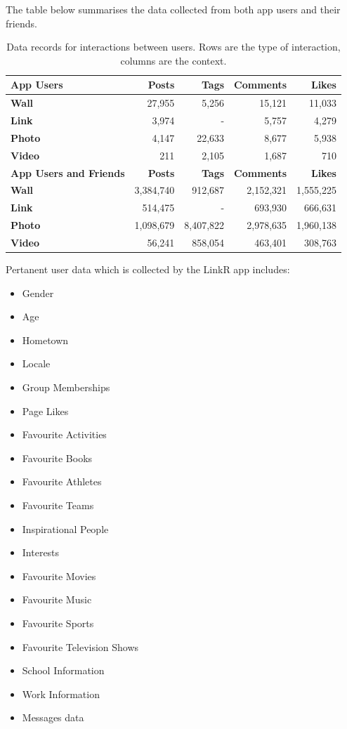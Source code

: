 The table below summarises the data collected from both app users and their friends.

\begin{table}[!htbp]
\centering
	\begin{tabular}{|l|r|r|r|r|} %
		\hline
		\textbf{App Users} & \textbf{Posts} & \textbf{Tags} & \textbf{Comments} & \textbf{Likes}  \\ \hline
		\textbf{Wall} & 27,955 & 5,256 & 15,121 & 11,033 \\ \hline
		\textbf{Link} & 3,974 & - & 5,757 & 4,279 \\ \hline
		\textbf{Photo} & 4,147 & 22,633 & 8,677 & 5,938 \\ \hline
		\textbf{Video} & 211 & 2,105 & 1,687 & 710 \\ \hline
		 \hline
		\textbf{App Users and Friends} & \textbf{Posts} & \textbf{Tags} & \textbf{Comments} & \textbf{Likes}  \\ \hline
		\textbf{Wall} & 3,384,740 & 912,687 & 2,152,321 & 1,555,225 \\ \hline
		\textbf{Link} & 514,475 & - & 693,930 & 666,631 \\ \hline
		\textbf{Photo} & 1,098,679 & 8,407,822 & 2,978,635 & 1,960,138 \\ \hline
		\textbf{Video} & 56,241 & 858,054 & 463,401 & 308,763 \\ \hline
	\end{tabular}
	\caption{Data records for interactions between users. Rows are the type of interaction, columns are the context.}
	\label{tab:revpol}
\end{table}

Pertanent user data which is collected by the LinkR app includes:
\begin{itemize}
\item Gender
\item Age
\item Hometown
\item Locale
\item Group Memberships
\item Page Likes
\item Favourite Activities
\item Favourite Books
\item Favourite Athletes
\item Favourite Teams
\item Inspirational People
\item Interests
\item Favourite Movies
\item Favourite Music
\item Favourite Sports
\item Favourite Television Shows
\item School Information
\item Work Information
\item Messages data
\end{itemize}


